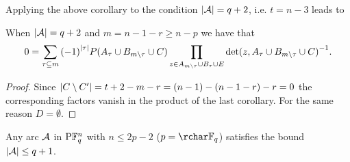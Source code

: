 Applying the above corollary to the condition $\left\vert{\mathcal{A}}\right\vert=q+2$, i.e. $t=n-3$ leads to

\begin{corollary}
    When $\left\vert{\mathcal{A}}\right\vert=q+2$ and $m=n-1-r\geq n-p$ we have that
    $$
  0 = \sum_{\tau\subseteq m}{{(-1)}^{\left\vert{\tau}\right\vert}P(A_{\tau}\cup B_{m\setminus\tau}\cup C)}\prod_{\substack{z\in A_{m\setminus\tau}\cup B_{\tau}\cup E}}{{\det(z,A_{\tau}\cup B_{m\setminus\tau}\cup C)}^{-1}}.
    $$
\end{corollary}

\begin{proof}
    Since $\left\vert{C\setminus C'}\right\vert=t+2-m-r=(n-1)-(n-1-r)-r=0$ the corresponding factors vanish in the product of the last corollary. For the same reason $D=\emptyset$.
\end{proof}

\begin{corollary}
    Any arc $\mathcal{A}$ in $\P \field{q}^n$ with $n\leq 2p-2$ ($p=\rchar \field{q}$) satisfies the bound $\left\vert{\mathcal{A}}\right\vert\leq q+1$.
\end{corollary}

